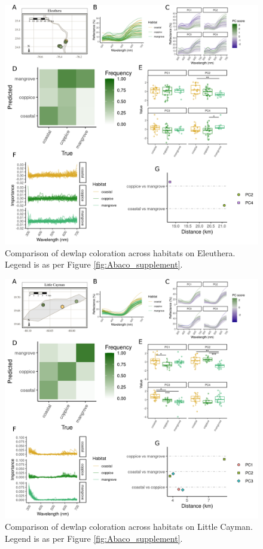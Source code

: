 \pagebreak

\begin{figure}[H]
	\centering
	\includegraphics[width=\textwidth]{figures/Eleuthera_supplement.png}
	\caption{Comparison of dewlap coloration across habitats on Eleuthera. Legend is as per Figure \ref{fig:Abaco_supplement}.}
	\label{fig:Eleuthera}
\end{figure}

\pagebreak

\begin{figure}[H]
	\centering
	\includegraphics[width=\textwidth]{figures/LittleCayman_supplement.png}
	\caption{Comparison of dewlap coloration across habitats on Little Cayman. Legend is as per Figure \ref{fig:Abaco_supplement}.}
	\label{fig:LittleCayman}
\end{figure}

